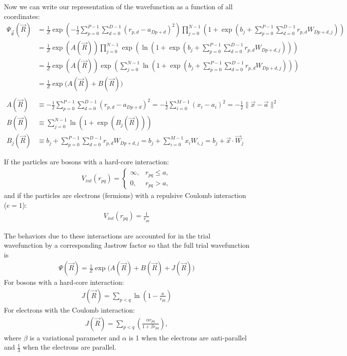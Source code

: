 \documentclass[12pt]{article}
\begin{document}
\noindent Now we can write our representation of the wavefunction as a function of all coordinates:
\begin{align*}
\Psi_{\vec{\theta}}(\vec{R}) &=\frac{1}{Z} \exp \left( -\frac{1}{2} \sum_{p=0}^{P-1}\sum_{d=0}^{D-1} (r_{p,d} - a_{Dp+d})^2 \right) \prod_{j=0}^{N-1} \left( 1 + \exp \left( b_j + \sum_{p=0}^{P-1}\sum_{d=0}^{D-1} r_{p,d} W_{Dp+d,j} \right) \right)\\
&=\frac{1}{Z} \exp (A(\vec{R})) \prod_{j=0}^{N-1} \exp\left( \ln \left(  1 + \exp \left( b_j + \sum_{p=0}^{P-1}\sum_{d=0}^{D-1} r_{p,d} W_{Dp+d,j} \right) \right) \right) \\
&=\frac{1}{Z} \exp (A(\vec{R})) \exp \left( \sum_{j=0}^{N-1} \ln \left(  1 + \exp \left( b_j + \sum_{p=0}^{P-1}\sum_{d=0}^{D-1} r_{p,d} W_{Dp+d,j} \right) \right) \right) \\
&= \frac{1}{Z} \exp  \Big( A(\vec{R})+ B(\vec{R}) \Big) \\ \\
A(\vec{R}) &\equiv -\frac{1}{2} \sum_{p=0}^{P-1}\sum_{d=0}^{D-1} (r_{p,d} - a_{Dp+d})^2 = - \frac{1}{2}\sum_{i=0}^{M-1} (x_i-a_i)^2 = -\frac{1}{2} \| \vec{x} - \vec{a} \|^2\\
B(\vec{R}) &\equiv \sum_{j=0}^{N-1} \ln \left(  1 + \exp \left( B_j (\vec{R}) \right) \right)\\
B_j(\vec{R}) &\equiv b_j + \sum_{p=0}^{P-1}\sum_{d=0}^{D-1} r_{p,d} W_{Dp+d,j} = b_j + \sum_{i=0}^{M-1} x_i W_{i,j} = b_j + \vec{x}\cdot \vec{W}_j
\end{align*}

\noindent If the particles are bosons with a hard-core interaction:
\begin{align*}
V_{int} (r_{pq}) = 
\begin{cases} 
	\infty, & r_{pq} \leq a,\\
	0, & r_{pq} > a,
   \end{cases}
\end{align*}
and if the particles are electrons (fermions) with a repulsive Coulomb interaction ($e=1$):
\begin{align*}
V_{int} (r_{pq}) = \frac{1}{r_{pq}}
\end{align*}

\noindent The behaviors due to these interactions are accounted for in the trial wavefunction by a corresponding Jastrow factor so that the full trial wavefunction is 
\begin{align*}
\Psi (\vec{R}) = \frac{1}{Z} \exp \Big( A(\vec{R})+B(\vec{R})+J(\vec{R}) \Big)
\end{align*}
For bosons with a hard-core interaction:
\begin{align*}
J(\vec{R}) = \sum_{p<q} \ln \left( 1-\frac{a}{r_{pq}} \right)
\end{align*}
For electrons with the Coulomb interaction:
\begin{align*}
J(\vec{R}) = \sum_{p<q} \left( \frac{\alpha r_{pq}}{1+\beta r_{pq}} \right),
\end{align*}
where $\beta$ is a variational parameter and $\alpha$ is 1 when the electrons are anti-parallel and $\frac{1}{3}$ when the electrons are parallel.\\ \\
\end{document}
